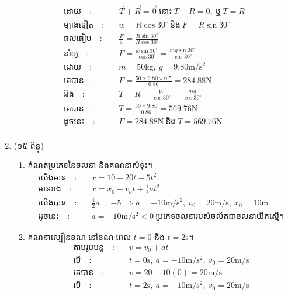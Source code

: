 \documentclass{classes/exam}
\begin{document}
\begin{enumerate}[I]
\begin{figure}[H]
\begin{align*}
			\text{ដោយ}\quad :&\quad \overrightarrow{T} + \overrightarrow{R}=\vec{0}~\text{នោះ}~T-R=0,~\text{ឬ}~T=R\\
			\text{ម្យ៉ាងទៀត}\quad :&\quad w=R\cos 30^\circ~\text{និង}~F=R\sin 30^\circ\\
			\text{ផលធៀប}\quad :&\quad \frac{F}{w}=\frac{R\sin 30^\circ}{R\cos 30^\circ}\\
			\text{នាំឲ្យ}\quad :&\quad F=\frac{w\sin 30^\circ}{\cos 30^\circ}=\frac{mg\sin 30^\circ}{\cos 30^\circ}\\
			\text{ដោយ}\quad :&\quad m=50\si{\kilogram},~g=9.80\si{\metre/\second^{2}}\\
			\text{គេបាន}\quad :&\quad F=\frac{50\times 9.80\times 0.5}{0.86}=284.88\si{\newton}\\
			\text{និង}\quad :& \quad T=R=\frac{W}{\cos 30^\circ}=\frac{mg}{\cos 30^\circ}\\
			\text{គេបាន}\quad :&\quad T=\frac{50\times 9.80}{0.86}=569.76\si{\newton}\\
			\text{ដូចនេះ}\quad :&\quad F=284.88\si{\newton}~\text{និង}~ T=569.76\si{\newton}\\
		\end{align*}
	\end{figure}
	\item {\color{magenta}\ks (១៥ ពិន្ទុ)}
	\begin{enumerate}[k]
		\item កំណត់ប្រភេទនៃចលនា និងគណនាសំទុះ។
		\begin{align*}
			\text{យើងមាន}\quad :&\quad x=10+20t-5t^{2}\\
			\text{មានរាង}\quad :&\quad x=x_{0}+v_{o}t+\frac{1}{2}at^{2}\\
			\text{យើងបាន}\quad :&\quad \frac{1}{2}a=-5~\Rightarrow a=-10\si{\metre/\second^{2}},~v_{0}=20\si{\metre/\second},~x_{0}=10\si{\metre}\\
			\text{ដូចនេះ}\quad :&\quad a=-10\si{\metre/\second^{2}}<0~\text{ប្រភេទចលនារបស់ចល័តជាចលនាយឺតស្មើ។}
		\end{align*}
		\item គណនាល្បឿនខណៈនៅខណៈពេល $t=0$ និង $t=2\si{\second}$។
			\begin{align*}
				\text{តាមរូបមន្ត}\quad :&\quad v=v_{0}+at\\
				\text{បើ}\quad :&\quad t=0\si{\second},~a=-10\si{\metre/\second^{2}},~v_{0}=20\si{\metre/\second}\\
				\text{គេបាន}\quad :&\quad v=20-10\left(0\right)=20\si{\metre/\second}\\
				\text{បើ}\quad :&\quad t=2\si{\second},~a=-10\si{\metre/\second^{2}},~v_{0}=20\si{\metre/\second}\\

\end{align*}
\end{enumerate}
\end{enumerate}
\end{document}
